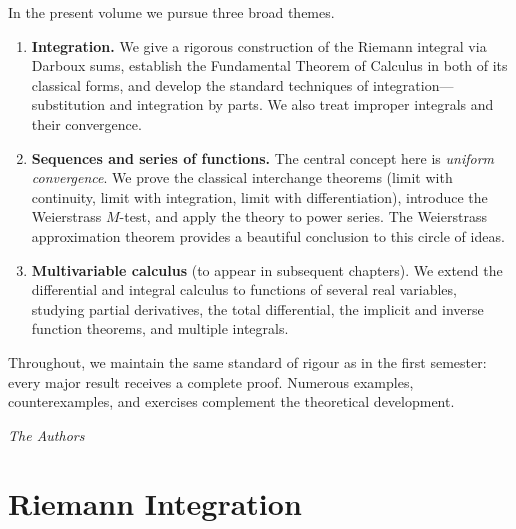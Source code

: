 \documentclass[12pt,a4paper]{book}
\theoremstyle{definition}
\begin{document}
In the present volume we pursue three broad themes.

\begin{enumerate}[label=(\roman*)]
\item \textbf{Integration.}  We give a rigorous construction of the
  Riemann integral via Darboux sums, establish the Fundamental Theorem
  of Calculus in both of its classical forms, and develop the standard
  techniques of integration---substitution and integration by parts.  We
  also treat improper integrals and their convergence.

\item \textbf{Sequences and series of functions.}  The central concept
  here is \emph{uniform convergence}.  We prove the classical
  interchange theorems (limit with continuity, limit with integration,
  limit with differentiation), introduce the Weierstrass $M$-test, and
  apply the theory to power series.  The Weierstrass approximation
  theorem provides a beautiful conclusion to this circle of ideas.

\item \textbf{Multivariable calculus} (to appear in subsequent
  chapters).  We extend the differential and integral calculus to
  functions of several real variables, studying partial derivatives, the
  total differential, the implicit and inverse function theorems, and
  multiple integrals.
\end{enumerate}

Throughout, we maintain the same standard of rigour as in the first
semester: every major result receives a complete proof.  Numerous
examples, counterexamples, and exercises complement the theoretical
development.

\bigskip
\hfill\textit{The Authors}

\mainmatter



\chapter{Riemann Integration}\label{ch:riemann}
\end{document}

